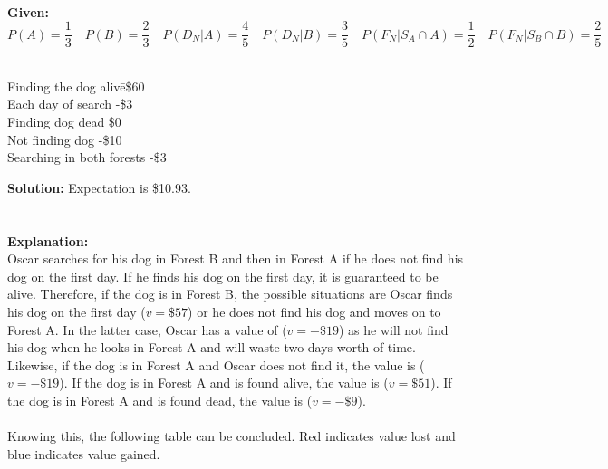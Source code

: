 \\
{\bf Given:}\\    
    $ P(A) = \dfrac{1}{3} \quad P(B) = \dfrac{2}{3} \quad P(D_{N}|A) = \dfrac{4}{5} \quad P(D_{N}|B) = \dfrac{3}{5} \quad P(F_{N}|S_A \cap A) = \dfrac{1}{2} \quad P(F_{N}|S_B \cap B) = \dfrac{2}{5} $\\ \\
    \begin{tabbing}
        \hspace{15em}Finding the dog alive\hspace{10em}\=      \hspace{2.5pt}\$60\\
        \hspace{15em}Each day of search\>         -\$3   \\
        \hspace{15em}Finding dog dead\>           \hspace{2.5pt}\$0   \\
        \hspace{15em}Not finding dog\>            -\$10  \\
        \hspace{15em}Searching in both forests\>  -\$3   \\
    \end{tabbing} 
{\bf Solution:}
    {\color{blue}Expectation is \$10.93.}\\ \\
\pagebreak \\
{\bf Explanation:}\\
Oscar searches for his dog in Forest B and then in Forest A if he does not find his dog on the first day. If he finds his dog on the first day, it is guaranteed to be alive. Therefore, if the dog is in Forest B, the possible situations are Oscar finds his dog on the first day ($v=\$57$) or he does not find his dog and moves on to Forest A. In the latter case, Oscar has a value of ($v=-\$19$) as he will not find his dog when he looks in Forest A and will waste two days worth of time. Likewise, if the dog is in Forest A and Oscar does not find it, the value is ($v=-\$19$). If the dog is in Forest A and is found alive, the value is ($v=\$51$). If the dog is in Forest A and is found dead, the value is ($v=-\$9$).   \\\\
Knowing this, the following table can be concluded. Red indicates value lost and blue indicates value gained.\\
